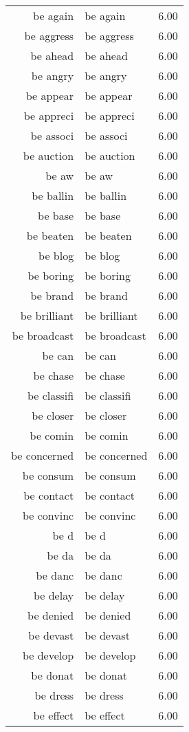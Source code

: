 \begin{table}[ht]
\begin{tabular}{rlr}
  be again & be again & 6.00 \\ 
  be aggress & be aggress & 6.00 \\ 
  be ahead & be ahead & 6.00 \\ 
  be angry & be angry & 6.00 \\ 
  be appear & be appear & 6.00 \\ 
  be appreci & be appreci & 6.00 \\ 
  be associ & be associ & 6.00 \\ 
  be auction & be auction & 6.00 \\ 
  be aw & be aw & 6.00 \\ 
  be ballin & be ballin & 6.00 \\ 
  be base & be base & 6.00 \\ 
  be beaten & be beaten & 6.00 \\ 
  be blog & be blog & 6.00 \\ 
  be boring & be boring & 6.00 \\ 
  be brand & be brand & 6.00 \\ 
  be brilliant & be brilliant & 6.00 \\ 
  be broadcast & be broadcast & 6.00 \\ 
  be can & be can & 6.00 \\ 
  be chase & be chase & 6.00 \\ 
  be classifi & be classifi & 6.00 \\ 
  be closer & be closer & 6.00 \\ 
  be comin & be comin & 6.00 \\ 
  be concerned & be concerned & 6.00 \\ 
  be consum & be consum & 6.00 \\ 
  be contact & be contact & 6.00 \\ 
  be convinc & be convinc & 6.00 \\ 
  be d & be d & 6.00 \\ 
  be da & be da & 6.00 \\ 
  be danc & be danc & 6.00 \\ 
  be delay & be delay & 6.00 \\ 
  be denied & be denied & 6.00 \\ 
  be devast & be devast & 6.00 \\ 
  be develop & be develop & 6.00 \\ 
  be donat & be donat & 6.00 \\ 
  be dress & be dress & 6.00 \\ 
  be effect & be effect & 6.00 \\ 

\end{tabular}
\end{table}
